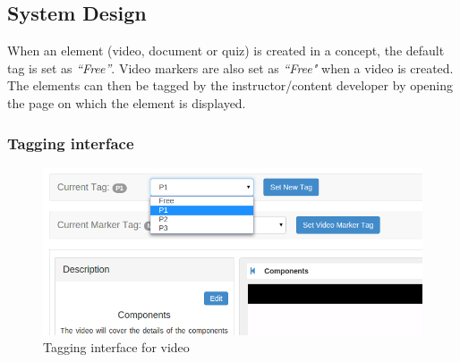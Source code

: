 \subsection{System Design}

When an element (video, document or quiz) is created in a concept, the default tag is set as \textit{``Free''}. Video markers are also set as \textit{``Free"} when a video is created. The elements can then be tagged by the instructor/content developer by opening the page on which the element is displayed.

\subsubsection{Tagging interface}

\begin{figure}[h]
\centering
\includegraphics[width=1\linewidth]{./media/tagging_interface}
\caption{Tagging interface for video}
\label{fig:tagging_interface}
\end{figure}

